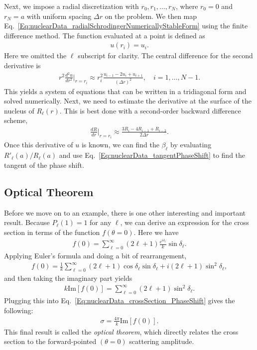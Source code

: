 Next, we impose a radial discretization with $r_0, r_1, \ldots, r_N$, where $r_0 = 0$ and $r_N = a$ with uniform spacing $\Delta r$ on the problem. We then map Eq.~\eqref{Eq:nuclearData_radialSchrodingerNumericallyStableForm} using the finite difference method. The function evaluated at a point is defined as
\begin{align}
  u(r_i) = u_i.
\end{align}
Here we omitted the $\ell$ subscript for clarity. The central difference for the second derivative is
\begin{align}
  r^2 \frac{d^2 u}{dr^2} \bigg|_{r = r_i} \approx  r_i^2 \frac{ u_{i-1} - 2 u_i + u_{i+1} }{ ( \Delta r )^2 } , \quad i = 1, \ldots, N-1 .
\end{align}
This yields a system of equations that can be written in a tridiagonal form and solved numerically. Next, we need to estimate the derivative at the surface of the nucleus of $R_\ell(r)$. This is best done with a second-order backward difference scheme,
\begin{align}
  \frac{dR}{dr}  \bigg|_{r = r_i} \approx \frac{ 3R_i - 4 R_{i-1} + R_{i-2} }{ 2 \Delta r } .
\end{align}
Once this derivative of $u$ is known, we can find the $\beta_\ell$ by evaluating $R'_\ell(a)/R_\ell(a)$ and use Eq.~\eqref{Eq:nuclearData_tangentPhaseShift} to find the tangent of the phase shift.

\subsection{Optical Theorem}

Before we move on to an example, there is one other interesting and important result. Because $P_\ell(1) = 1$ for any $\ell$, we can derive an expression for the cross section in terms of the function $f(\theta = 0)$. Here we have
\begin{align}
  f(0) =  \sum_{\ell=0}^\infty ( 2\ell + 1 ) \frac{ e^{i \delta_\ell } }{k} \sin\delta_\ell .
\end{align}
Applying Euler's formula and doing a bit of rearrangement,
\begin{align}
  f(0) = \frac{1}{k} \sum_{\ell=0}^\infty  ( 2\ell + 1 ) \cos\delta_\ell \sin\delta_\ell  + i ( 2\ell + 1 )  \sin^2\delta_\ell ,
\end{align}
and then taking the imaginary part yields
\begin{align}
  k \text{Im}[ f(0) ] =  \sum_{\ell=0}^\infty ( 2\ell + 1 )  \sin^2\delta_\ell .
\end{align}
Plugging this into Eq.~\eqref{Eq:nuclearData_crossSection_PhaseShift} gives the following:
\begin{align}
  \sigma = \frac{4\pi}{k} \text{Im}[ f(0) ].
\end{align}
This final result is called the \emph{optical theorem}, which directly relates the cross section to the forward-pointed $(\theta = 0)$ scattering amplitude. 


